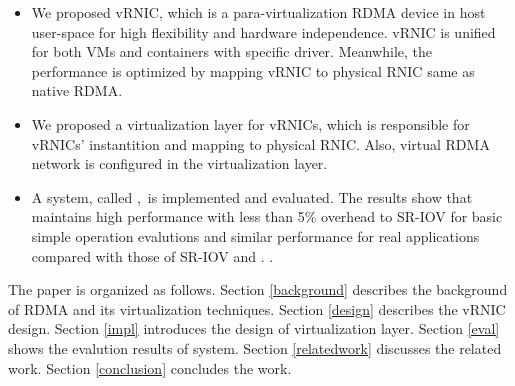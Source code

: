 \begin{itemize}
	\item We proposed vRNIC, which is a para-virtualization RDMA device in host user-space for high flexibility and hardware independence. vRNIC is unified for both VMs and containers with specific driver. Meanwhile, the performance is optimized by mapping vRNIC to physical RNIC same as native RDMA.
	
	\item We proposed a virtualization layer for vRNICs, which is responsible for vRNICs' instantition and mapping to physical RNIC. Also, virtual RDMA network is configured in the virtualization layer.
	
	\item A system, called \sys,~is implemented and evaluated. The results show that \sys maintains high performance with less than 5\% overhead to SR-IOV for basic simple operation evalutions and similar performance for real applications compared with those of SR-IOV and \native.  .
\end{itemize}

The paper is organized as follows. Section \ref{background} describes the background of RDMA and its virtualization techniques. Section \ref{design} describes the vRNIC design. Section \ref{impl} introduces the design of virtualization layer. Section \ref{eval} shows the evalution results of \sys system. Section \ref{relatedwork} discusses the related work. Section \ref{conclusion} concludes the work.